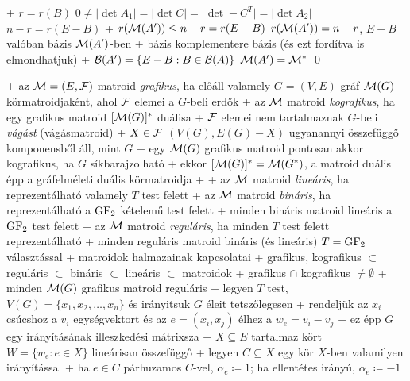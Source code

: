     + $r = r(B)$ \LRA $0 \ne \rvert \det A_1 \lvert = \rvert \det C \lvert = \rvert
      \det -C^T \lvert = \rvert \det A_2 \lvert$ \LRA $n - r = r(E -
      B)$
  + $r(\mathcal{M}(A')) \le n - r = r(E - B)$ \RA $r(\mathcal{M}(A')) = n - r$, $E -
    B$ valóban bázis $\mathcal{M}(A')$-ben
    + bázis komplementere bázis (és ezt fordítva is elmondhatjuk)
    + $\mathcal{B}(A') = \{ E - B : B \in \mathcal{B}(A) \}$ \RA $\mathcal{M}(A') = \mathcal{M}^*$ \qed


+ \dfn az $\mathcal{M} = (E, \mathcal{F})$ matroid \emph{grafikus}, ha előáll valamely
  $G = (V, E)$ gráf $\mathcal{M}(G)$ körmatroidjaként, ahol $\mathcal{F}$ elemei a
  $G$-beli erdők
+ \dfn az $\mathcal{M}$ matroid \emph{kografikus}, ha egy grafikus matroid
  $[\mathcal{M}(G)]^*$ duálisa
  + $\mathcal{F}$ elemei nem tartalmaznak $G$-beli \emph{vágást} (vágásmatroid)
  + $X \in \mathcal{F}$ \LRA $(V(G), E(G) - X)$ ugyanannyi összefüggő
    komponensből áll, mint $G$
+ \thm egy $\mathcal{M}(G)$ grafikus matroid pontosan akkor kografikus, ha $G$
  síkbarajzolható
  + ekkor $[\mathcal{M}(G)]^* = \mathcal{M}(G^*)$, a matroid duális épp a gráfelméleti
    duális körmatroidja
  + \noproof
+ \dfn az $\mathcal{M}$ matroid \emph{lineáris}, ha reprezentálható valamely
  $T$ test felett
+ \dfn az $\mathcal{M}$ matroid \emph{bináris}, ha reprezentálható a $\textrm{GF}_2$
  kételemű test felett
  + minden bináris matroid lineáris a $\textrm{GF}_2$ test felett
+ \dfn az $\mathcal{M}$ matroid \emph{reguláris}, ha minden $T$ test felett
  reprezentálható
  + minden reguláris matroid bináris (és lineáris) $T = \textrm{GF}_2$
    választással
+ matroidok halmazainak kapcsolatai
  + grafikus, kografikus $\subset$ reguláris $\subset$ bináris
    $\subset$ lineáris $\subset$ matroidok
  + grafikus $\cap$ kografikus $\ne \emptyset$
+ \thm minden $\mathcal{M}(G)$ grafikus matroid reguláris
  + \proof legyen $T$ test, $V(G) = \{ x_1, x_2, \ldots, x_n \}$ és
    irányitsuk $G$ éleit tetszőlegesen
  + rendeljük az $x_i$ csúcshoz a $v_i$ egységvektort és az $e = (x_i,
    x_j)$ élhez a $w_e = v_i - v_j$
    + ez épp $G$ egy irányításának illeszkedési mátrixsza
  + $X \subseteq E$ tartalmaz kört \RA $W = \{ w_e : e \in X \}$
    lineárisan összefüggő
    + legyen $C \subseteq X$ egy kör $X$-ben valamilyen irányítással
    + ha $e \in C$ párhuzamos $C$-vel, $\alpha_e \coloneqq 1$; ha
      ellentétes irányú, $\alpha_e \coloneqq -1$
